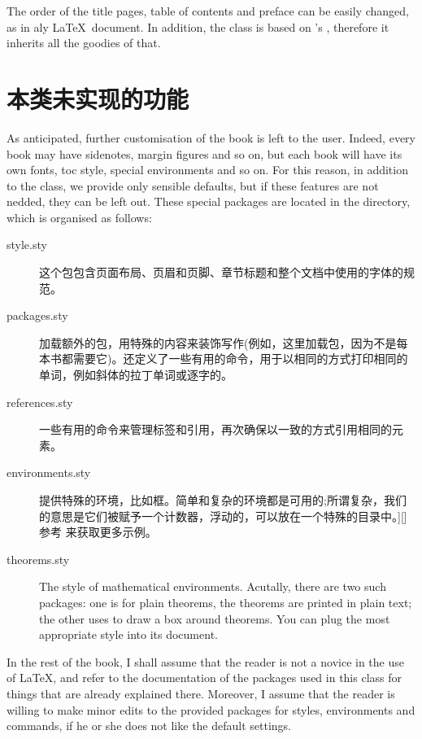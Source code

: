 The order of the title pages, table of contents and preface can be 
easily changed, as in aly \LaTeX\ document. In addition, the class is 
based on \KOMAScript's , therefore it inherits all the 
goodies of that.

\section{本类未实现的功能}

As anticipated, further customisation of the book is left to the user. 
Indeed, every book may have sidenotes, margin figures and so on, but 
each book will have its own fonts, toc style, special environments and 
so on. For this reason, in addition to the class, we provide only 
sensible defaults, but if these features are not nedded, they can be 
left out. These special packages are located in the  
directory, which is organised as follows:

\begin{description}
	\item[style.sty] 这个包包含页面布局、页眉和页脚、章节标题和整个文档中使用的字体的规范。
	\item[packages.sty] 加载额外的包，用特殊的内容来装饰写作(例如，这里加载包，因为不是每本书都需要它)。还定义了一些有用的命令，用于以相同的方式打印相同的单词，例如斜体的拉丁单词或逐字的。
	\item[references.sty] 一些有用的命令来管理标签和引用，再次确保以一致的方式引用相同的元素。
	\item[environments.sty] 提供特殊的环境，比如框。简单和复杂的环境都是可用的;所谓复杂，我们的意思是它们被赋予一个计数器，浮动的，可以放在一个特殊的目录中。\sidenote[[*1]][]{参考 
	来获取更多示例。}
	\item[theorems.sty] The style of mathematical environments. 
	Acutally, there are two such packages: one is for plain theorems, 
	\ie the theorems are printed in plain text; the other uses 
	 to draw a box around theorems. You can plug the 
	most appropriate style into its document.
\end{description}


In the rest of the book, I shall assume that the reader is not a novice 
in the use of \LaTeX, and refer to the documentation of the packages 
used in this class for things that are already explained there. 
Moreover, I assume that the reader is willing to make minor edits to the 
provided packages for styles, environments and commands, if he or she 
does not like the default settings.